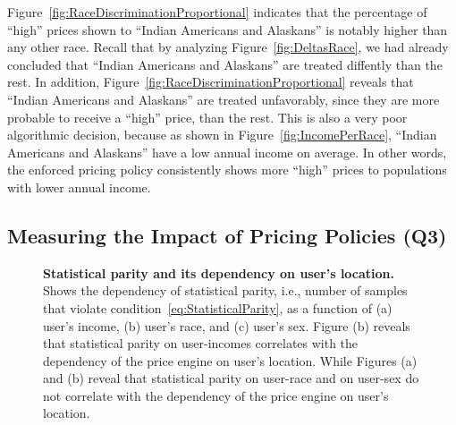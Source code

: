 Figure~\ref{fig:RaceDiscriminationProportional} indicates that the
percentage of ``high'' prices shown to ``Indian Americans and Alaskans'' is
notably higher than any other race. Recall that by analyzing
Figure~\ref{fig:DeltasRace}, we had already concluded that
``Indian Americans and Alaskans'' are treated diffently than the rest.
In addition, Figure~\ref{fig:RaceDiscriminationProportional} reveals that
``Indian Americans and Alaskans'' are treated unfavorably, since they are
more probable to receive a ``high'' price, than the rest. This is also a very
poor algorithmic decision, because as shown in Figure~\ref{fig:IncomePerRace},
``Indian Americans and Alaskans'' have a low annual income on average. In
other words, the enforced pricing policy consistently shows more
``high'' prices to populations with lower annual income.


\subsection{\normalsize Measuring the Impact of Pricing Policies (Q3)}


\begin{figure*}[t]
{
 \caption{\textbf{Statistical parity and its dependency on user's location.}
          Shows the dependency of statistical parity, i.e., number of samples that
          violate condition~\ref{eq:StatisticalParity}, as a function of (a) user's income,
          (b) user's race, and (c) user's sex. Figure (b) reveals that statistical parity on
          user-incomes correlates with the dependency of the price engine on user's location.
          While Figures (a) and (b) reveal that statistical parity on user-race and on user-sex
          do not correlate with the dependency of the price engine on user's location.}
 \label{fig:Deltas}
}
\end{figure*}


